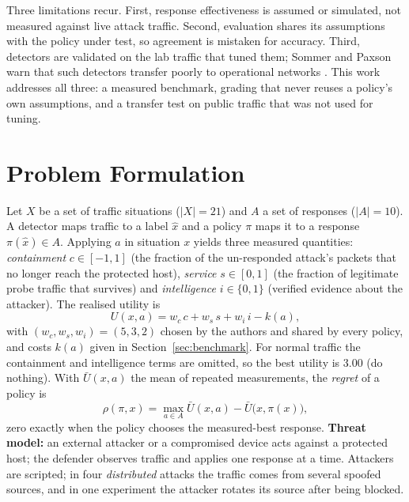 \documentclass[conference]{IEEEtran}
\newcommand{\regret}{\rho}
\begin{document}
Three limitations recur. First, response effectiveness is assumed or simulated, not measured against live attack traffic. Second, evaluation shares its assumptions with the policy under test, so agreement is mistaken for accuracy. Third, detectors are validated on the lab traffic that tuned them; Sommer and Paxson warn that such detectors transfer poorly to operational networks \cite{sommer2010outside}. This work addresses all three: a measured benchmark, grading that never reuses a policy's own assumptions, and a transfer test on public traffic that was not used for tuning.

\section{Problem Formulation}
\label{sec:problem}
Let $X$ be a set of traffic situations ($|X|=21$) and $A$ a set of responses ($|A|=10$). A detector maps traffic to a label $\hat{x}$ and a policy $\pi$ maps it to a response $\pi(\hat{x})\in A$. Applying $a$ in situation $x$ yields three measured quantities: \emph{containment} $c\in[-1,1]$ (the fraction of the un-responded attack's packets that no longer reach the protected host), \emph{service} $s\in[0,1]$ (the fraction of legitimate probe traffic that survives) and \emph{intelligence} $i\in\{0,1\}$ (verified evidence about the attacker). The realised utility is
\begin{equation}
U(x,a)=w_c\,c+w_s\,s+w_i\,i-k(a),
\label{eq:utility}
\end{equation}
with $(w_c,w_s,w_i)=(5,3,2)$ chosen by the authors and shared by every policy, and costs $k(a)$ given in Section~\ref{sec:benchmark}. For normal traffic the containment and intelligence terms are omitted, so the best utility is 3.00 (do nothing). With $\bar U(x,a)$ the mean of repeated measurements, the \emph{regret} of a policy is
\begin{equation}
\regret(\pi,x)=\max_{a\in A}\bar U(x,a)-\bar U\big(x,\pi(x)\big),
\label{eq:regret}
\end{equation}
zero exactly when the policy chooses the measured-best response. \textbf{Threat model:} an external attacker or a compromised device acts against a protected host; the defender observes traffic and applies one response at a time. Attackers are scripted; in four \emph{distributed} attacks the traffic comes from several spoofed sources, and in one experiment the attacker rotates its source after being blocked.
\end{document}
